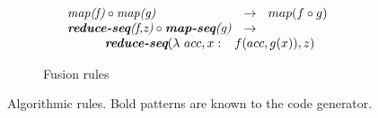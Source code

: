 \begin{figure}[t]
\vspace{\ruleSpace}
\begin{subfigure}[b]{1\linewidth}
\begin{mdframed}
$$
\begin{array}{ll}
\pat{map(f)} \circ \pat{map(g)}                                & \rightarrow \ \ map(f \circ g)\\
\pat{\textbf{reduce-seq}(f,z)} \circ \pat{\textbf{map-seq}(g)} & \rightarrow \\
{\hspace{3em}} \pat{\textbf{reduce-seq}}(\lambda\ acc,x:& \hspace{-.75em}f(acc, g(x)), z)\\  %
\end{array}
$$
\end{mdframed}
 \caption{Fusion rules}
  \label{fig:algo:fusion}
\end{subfigure}

\caption{Algorithmic rules. Bold patterns are known to the code generator.}
\label{fig:algoRuleg}
\end{figure}



